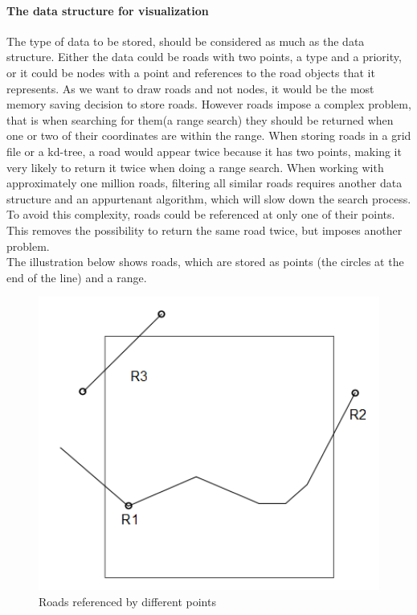 \documentclass[a4paper,10pt,titlepage]{article}
\begin{document}
\paragraph{The data structure for visualization}

The type of data to be stored, should be considered as much as the data structure. Either the data could be roads with two points, a type and a priority, or it could be nodes with a point and references to the road objects that it represents. As we want to draw roads and not nodes, it would be the most memory saving decision to store roads. However roads impose a complex problem, that is when searching for them(a range search) they should be returned when one or two of their coordinates are within the range. When storing roads in a grid file or a kd-tree, a road would appear twice because it has two points, making it very likely to return it twice when doing a range search. When working with approximately one million roads, filtering all similar roads requires another data structure and an appurtenant algorithm, which will slow down the search process.\\To avoid this complexity, roads could be referenced at only one of their points. This removes the possibility to return the same road twice, but imposes another problem.\\
The illustration below shows roads, which are stored as points (the circles at the end of the line) and a range.

\begin{figure}[H]
\includegraphics[width=120mm]{roadsRef.png}
\caption{Roads referenced by different points}
\label{fig:roads}
\end{figure}
\end{document}
